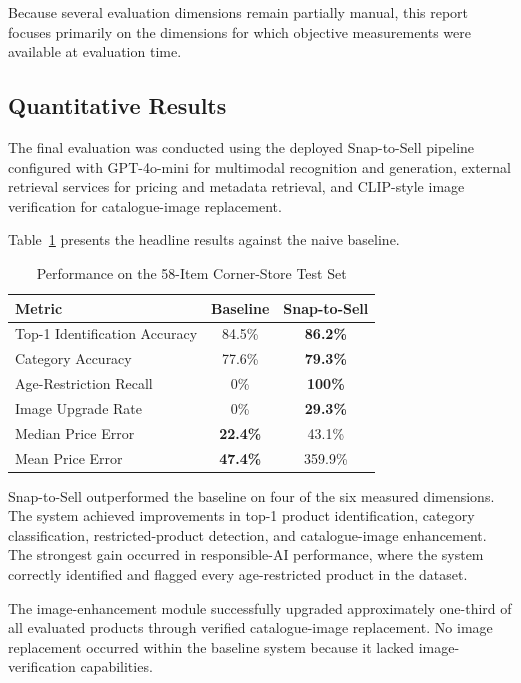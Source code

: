 \documentclass[conference]{IEEEtran}
\begin{document}
Because several evaluation dimensions remain partially manual, this report
focuses primarily on the dimensions for which objective measurements were
available at evaluation time. 

\subsection{Quantitative Results}

The final evaluation was conducted using the deployed Snap-to-Sell pipeline
configured with GPT-4o-mini for multimodal recognition and generation,
external retrieval services for pricing and metadata retrieval,
and CLIP-style image verification for catalogue-image replacement. 

Table~\ref{tab:results} presents the headline results against the naive
baseline.

\begin{table}[t]
\caption{Performance on the 58-Item Corner-Store Test Set}
\label{tab:results}
\centering
\begin{tabular}{@{}lcc@{}}
\toprule
Metric & Baseline & Snap-to-Sell \\
\midrule
Top-1 Identification Accuracy & 84.5\% & \textbf{86.2\%} \\
Category Accuracy & 77.6\% & \textbf{79.3\%} \\
Age-Restriction Recall & 0\% & \textbf{100\%} \\
Image Upgrade Rate & 0\% & \textbf{29.3\%} \\
Median Price Error & \textbf{22.4\%} & 43.1\% \\
Mean Price Error & \textbf{47.4\%} & 359.9\% \\
\bottomrule
\end{tabular}
\end{table}

Snap-to-Sell outperformed the baseline on four of the six measured dimensions.
The system achieved improvements in top-1 product identification,
category classification, restricted-product detection,
and catalogue-image enhancement.
The strongest gain occurred in responsible-AI performance,
where the system correctly identified and flagged every age-restricted
product in the dataset. 

The image-enhancement module successfully upgraded approximately one-third of
all evaluated products through verified catalogue-image replacement.
No image replacement occurred within the baseline system because it lacked
image-verification capabilities. 
\end{document}
